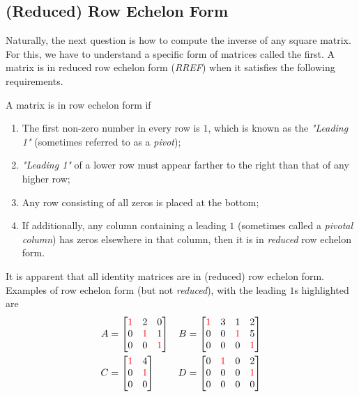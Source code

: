 \subsection{(Reduced) Row Echelon Form}
\label{section:echelon}
Naturally, the next question is how to compute the inverse of any square matrix. For this, we have to understand a specific form of matrices called the  first. A matrix is in reduced row echelon form (\textit{RREF}) when it satisfies the following requirements.
\begin{defn}
\label{defn:rref}
A matrix is in row echelon form if
\begin{enumerate}
\item The first non-zero number in every row is $1$, which is known as the \textit{"Leading 1"} (sometimes referred to as a \textit{pivot});
\item \textit{"Leading 1"} of a lower row must appear farther to the right than that of any higher row;
\item Any row consisting of all zeros is placed at the bottom;
\item If additionally, any column containing a leading $1$ (sometimes called a \textit{pivotal column}) has zeros elsewhere in that column, then it is in \textit{reduced} row echelon form.
\end{enumerate}
\end{defn}
It is apparent that all identity matrices are in (reduced) row echelon form. Examples of row echelon form (but not \textit{reduced}), with the leading $1$s highlighted are
\begin{align*}
A &=
\begin{bmatrix}
\textcolor{red}{1} & 2 & 0 \\
0 & \textcolor{red}{1} & 1 \\
0 & 0 & \textcolor{red}{1}
\end{bmatrix}
& B &=
\begin{bmatrix}
\textcolor{red}{1} & 3 & 1 & 2 \\
0 & 0 & \textcolor{red}{1} & 5 \\
0 & 0 & 0 & \textcolor{red}{1}
\end{bmatrix} \\
C &=
\begin{bmatrix}
\textcolor{red}{1} & 4 \\
0 & \textcolor{red}{1} \\
0 & 0 
\end{bmatrix}
& D &=
\begin{bmatrix}
0 & \textcolor{red}{1} & 0 & 2 \\
0 & 0 & 0 & \textcolor{red}{1} \\
0 & 0 & 0 & 0
\end{bmatrix}
\end{align*}
